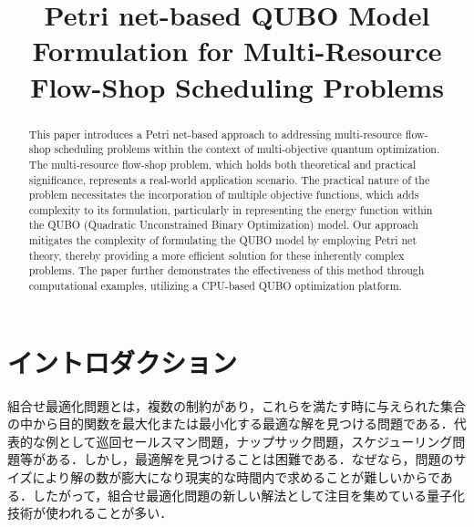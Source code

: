 \documentclass[conference]{IEEEtran}
\begin{document}
\title{Petri net-based QUBO Model Formulation for Multi-Resource Flow-Shop Scheduling Problems}

\author{
\and
{}
\and
{}
}

\maketitle

\begin{abstract}
This paper introduces a Petri net-based approach to addressing multi-resource flow-shop scheduling problems within the context of multi-objective quantum optimization. The multi-resource flow-shop problem, which holds both theoretical and practical significance, represents a real-world application scenario. The practical nature of the problem necessitates the incorporation of multiple objective functions, which adds complexity to its formulation, particularly in representing the energy function within the QUBO (Quadratic Unconstrained Binary Optimization) model.
Our approach mitigates the complexity of formulating the QUBO model by employing Petri net theory, thereby providing a more efficient solution for these inherently complex problems. The paper further demonstrates the effectiveness of this method through computational examples, utilizing a CPU-based QUBO optimization platform.
\end{abstract}

\section{イントロダクション}
組合せ最適化問題とは，複数の制約があり，これらを満たす時に与えられた集合の中から目的関数を最大化または最小化する最適な解を見つける問題である．代表的な例として巡回セールスマン問題，ナップサック問題，スケジューリング問題等がある．しかし，最適解を見つけることは困難である．なぜなら，問題のサイズにより解の数が膨大になり現実的な時間内で求めることが難しいからである．したがって，組合せ最適化問題の新しい解法として注目を集めている量子化技術が使われることが多い．
\end{document}
